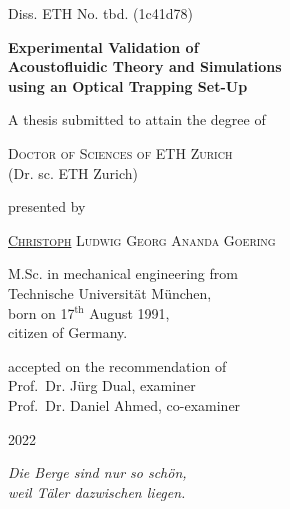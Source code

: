 \begin{titlepage}
  {Diss. ETH No. tbd. (1c41d78) \vspace{2.5cm}}
\begin{center}
\Large{\textbf{Experimental Validation of\\ Acoustofluidic Theory and 
Simulations\\ using an Optical Trapping Set-Up}}
\end{center}
\vspace{2.0cm}
\begin{center}
{A thesis submitted to attain the degree of}
\end{center}
\begin{center}
{\textsc{Doctor of Sciences of ETH Zurich}}\\
{(Dr. sc. ETH Zurich)}
\end{center}
\vspace{10mm}
\begin{center}
{presented by}
\end{center}
\begin{center}
  {\textsc{\underline{Christoph} Ludwig Georg Ananda Goering}}
\end{center}
\begin{center}
{M.Sc. in mechanical engineering from\\
Technische Universit\"at M\"unchen,\\
born on 17$^{\text{th}}$ August 1991,\\
citizen of Germany.}
\end{center}
\vspace{10mm}
\begin{center}
{accepted on the recommendation of \\ \vspace{0.3cm}
Prof.\ Dr. J\"urg Dual, examiner \\
Prof.\ Dr. Daniel Ahmed, co-examiner}
\end{center}
\vspace{5mm}
\begin{center}
2022
\end{center}

\cleardoublepage
\thispagestyle{empty}
\vspace*{5.0cm}

\begin{flushright}
\vspace*{0.5cm}
\large
\textit{Die Berge sind nur so schön,\\ weil Täler dazwischen liegen.}

\end{flushright}

\clearpage
\cleardoublepage
\end{titlepage}

